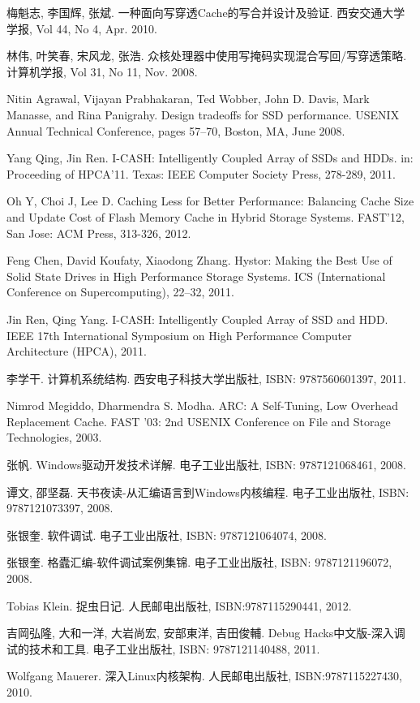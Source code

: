 \begin{thebibliography}
梅魁志, 李国辉, 张斌. 一种面向写穿透Cache的写合并设计及验证. 西安交通大学学报, Vol 44, No 4, Apr. 2010.

林伟, 叶笑春, 宋风龙, 张浩. 众核处理器中使用写掩码实现混合写回/写穿透策略. 计算机学报, Vol 31, No 11, Nov. 2008.

Nitin Agrawal, Vijayan Prabhakaran, Ted Wobber, John D. Davis, Mark Manasse, and Rina Panigrahy. Design tradeoffs for SSD performance. USENIX Annual Technical Conference, pages 57–70, Boston, MA, June 2008.

Yang Qing, Jin Ren. I-CASH: Intelligently Coupled Array of SSDs and HDDs. in: Proceeding of HPCA'11. Texas: IEEE Computer Society Press, 278-289, 2011.

Oh Y, Choi J, Lee D. Caching Less for Better Performance: Balancing Cache Size and Update Cost of Flash Memory Cache in Hybrid Storage Systems. FAST'12, San Jose: ACM Press, 313-326, 2012.

Feng Chen, David Koufaty, Xiaodong Zhang. Hystor: Making the Best Use of Solid State Drives in High Performance Storage Systems. ICS (International Conference on Supercomputing), 22–32, 2011.

Jin Ren, Qing Yang. I-CASH: Intelligently Coupled Array of SSD and HDD. IEEE 17th International Symposium on High Performance Computer Architecture (HPCA), 2011.

李学干. 计算机系统结构. 西安电子科技大学出版社, ISBN: 9787560601397, 2011.

Nimrod Megiddo, Dharmendra S. Modha. ARC: A Self-Tuning, Low Overhead Replacement Cache. FAST ’03: 2nd USENIX Conference on File and Storage Technologies, 2003.

张帆. Windows驱动开发技术详解. 电子工业出版社, ISBN: 9787121068461, 2008.

谭文, 邵坚磊. 天书夜读-从汇编语言到Windows内核编程.  电子工业出版社, ISBN: 9787121073397, 2008.

张银奎. 软件调试. 电子工业出版社, ISBN: 9787121064074, 2008.

张银奎. 格蠹汇编-软件调试案例集锦. 电子工业出版社, ISBN: 9787121196072, 2008.

Tobias Klein. 捉虫日记. 人民邮电出版社, ISBN:9787115290441, 2012.

吉岡弘隆, 大和一洋, 大岩尚宏, 安部東洋, 吉田俊輔. Debug Hacks中文版-深入调试的技术和工具. 电子工业出版社, ISBN: 9787121140488, 2011.

Wolfgang Mauerer. 深入Linux内核架构. 人民邮电出版社, ISBN:9787115227430, 2010.

\end{thebibliography}
